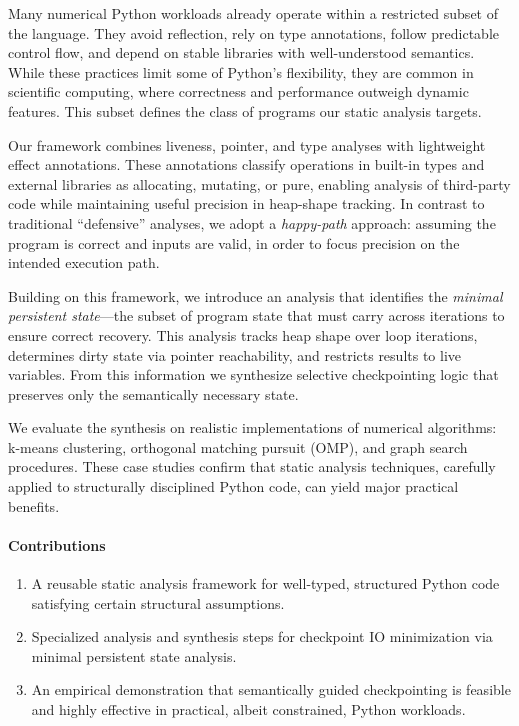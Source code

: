 Many numerical Python workloads already operate within a restricted subset of the language. They avoid reflection, rely on type annotations, follow predictable control flow, and depend on stable libraries with well-understood semantics. While these practices limit some of Python’s flexibility, they are common in scientific computing, where correctness and performance outweigh dynamic features. This subset defines the class of programs our static analysis targets.

Our framework combines liveness, pointer, and type analyses with lightweight effect annotations. These annotations classify operations in built-in types and external libraries as allocating, mutating, or pure, enabling analysis of third-party code while maintaining useful precision in heap-shape tracking. In contrast to traditional ``defensive'' analyses, we adopt a \emph{happy-path} approach: assuming the program is correct and inputs are valid, in order to focus precision on the intended execution path.

Building on this framework, we introduce an analysis that identifies the \emph{minimal persistent state}—the subset of program state that must carry across iterations to ensure correct recovery. This analysis tracks heap shape over loop iterations, determines dirty state via pointer reachability, and restricts results to live variables. From this information we synthesize selective checkpointing logic that preserves only the semantically necessary state.

We evaluate the synthesis on realistic implementations of numerical algorithms: k-means clustering, orthogonal matching pursuit (OMP), and graph search procedures. These case studies confirm that static analysis techniques, carefully applied to structurally disciplined Python code, can yield major practical benefits.


\paragraph{Contributions}
\begin{enumerate}
\item A reusable static analysis framework for well-typed, structured Python code satisfying certain structural assumptions.
\item Specialized analysis and synthesis steps for checkpoint IO minimization via minimal persistent state analysis.
\item An empirical demonstration that semantically guided checkpointing is feasible and highly effective in practical, albeit constrained, Python workloads.
\end{enumerate}

